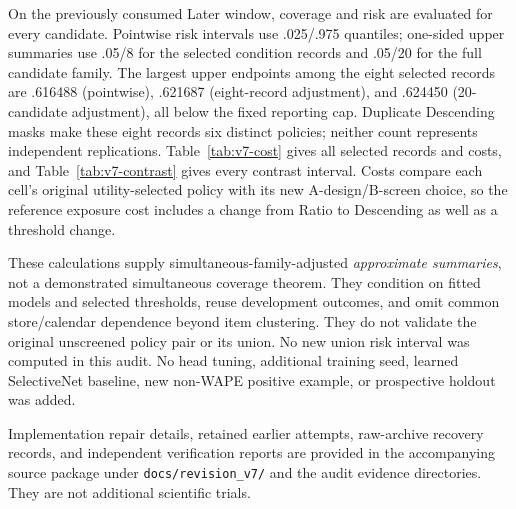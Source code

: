 On the previously consumed Later window, coverage and risk are evaluated for every candidate. Pointwise risk intervals use .025/.975 quantiles; one-sided upper summaries use .05/8 for the selected condition records and .05/20 for the full candidate family. The largest upper endpoints among the eight selected records are .616488 (pointwise), .621687 (eight-record adjustment), and .624450 (20-candidate adjustment), all below the fixed reporting cap. Duplicate Descending masks make these eight records six distinct policies; neither count represents independent replications. Table~\ref{tab:v7-cost} gives all selected records and costs, and Table~\ref{tab:v7-contrast} gives every contrast interval. Costs compare each cell's original utility-selected policy with its new A-design/B-screen choice, so the reference exposure cost includes a change from Ratio to Descending as well as a threshold change.


These calculations supply simultaneous-family-adjusted \emph{approximate summaries}, not a demonstrated simultaneous coverage theorem. They condition on fitted models and selected thresholds, reuse development outcomes, and omit common store/calendar dependence beyond item clustering. They do not validate the original unscreened policy pair or its union. No new union risk interval was computed in this audit. No head tuning, additional training seed, learned SelectiveNet baseline, new non-WAPE positive example, or prospective holdout was added.

Implementation repair details, retained earlier attempts, raw-archive recovery records, and independent verification reports are provided in the accompanying source package under \texttt{docs/revision\_v7/} and the audit evidence directories. They are not additional scientific trials.
